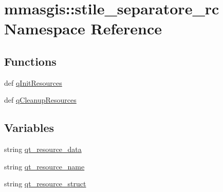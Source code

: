 \hypertarget{namespacemmasgis_1_1stile__separatore__rc}{
\section{mmasgis::stile\_\-separatore\_\-rc Namespace Reference}
\label{namespacemmasgis_1_1stile__separatore__rc}
}
\subsection*{Functions}
\begin{DoxyCompactItemize}
\item 
def \hyperlink{namespacemmasgis_1_1stile__separatore__rc_a45d0c6f32ba4e6caf1654e3e46555620}{qInitResources}
\item 
def \hyperlink{namespacemmasgis_1_1stile__separatore__rc_a7dc2e0b860abffd365fd8206b1f321bc}{qCleanupResources}
\end{DoxyCompactItemize}
\subsection*{Variables}
\begin{DoxyCompactItemize}
\item 
string \hyperlink{namespacemmasgis_1_1stile__separatore__rc_a970e890fe7f6d75826e1feae42c27da3}{qt\_\-resource\_\-data}
\item 
string \hyperlink{namespacemmasgis_1_1stile__separatore__rc_add0636e8e3b35cb13edc2c0daa3e13a5}{qt\_\-resource\_\-name}
\item 
string \hyperlink{namespacemmasgis_1_1stile__separatore__rc_a540efb837b3eeba509fa149bc4b25787}{qt\_\-resource\_\-struct}
\end{DoxyCompactItemize}


